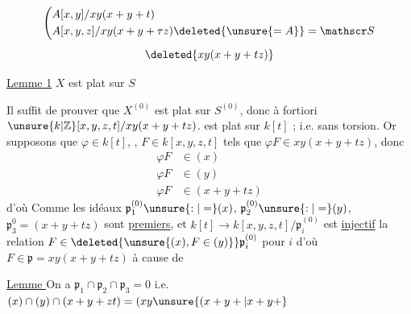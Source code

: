 \[
\left(\begin{aligned}
&A[x,y]/xy(x+y+t)\\
&A[x,y,z]/xy(x+y+\tau z)\deleted{\unsure{=A}}=\mathscr S
\end{aligned}\right.
\]
\[
\deleted{xy(x+y+tz)}
\]

\uline{Lemme 1} $X$ est plat sur $S$

Il suffit de prouver que $X^{(0)}$ est plat sur $S^{(0)}$, donc à fortiori  $\unsure{k|\mathbb Z}[x,y,z,t]/xy(x+y+tz)$. est plat sur $k[t]$ ;  i.e. sans torsion. Or supposons que $\varphi\in k[t]$, , $F\in k[x,y,z,t]$ tels que $\varphi F\in xy(x+y+tz)$, donc
\[
\begin{aligned}
\varphi F&\in(x)\\
\varphi F&\in(y)\\
\varphi F&\in(x+y+tz)
\end{aligned}
\]
d'où Comme  les idéaux  $\mathfrak p_1^{(0)}\unsure{:|=}(x)$, $\mathfrak p_2^{(0)}\unsure{:|=}(y)$, $\mathfrak p_3^{0}=(x+y+tz)$ sont  \uline{premiers}, et $k[t]\longrightarrow k[x,y,z,t]/\mathfrak p_i^{(0)}$ est \uline{injectif}  la relation $F\in\deleted{\unsure{(x), F\in(y)}}\mathfrak p_i^{(0)}$ pour  $i$  d'où $F\in\mathfrak p=xy(x+y+tz)$ à cause de

\uline{Lemme } On a $\mathfrak p_1\cap\mathfrak p_2\cap\mathfrak p_3=0$ i.e. $(x)\cap(y)\cap(x+y+zt)=(xy\unsure{(x+y+|x+y+}$
